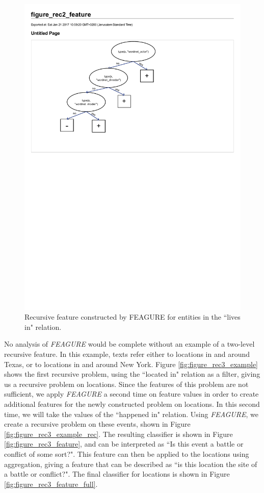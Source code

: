 \documentclass[twoside,11pt]{article}
\theoremstyle{definition}
\begin{document}
\begin{figure}[h!]
	\centering
	\includegraphics[width=0.7\linewidth]{figure_rec2_feature}
	\caption{Recursive feature constructed by FEAGURE for entities in the ``lives in" relation.}
	\label{fig:figure_rec2_feature}
\end{figure}

No analysis of \emph{FEAGURE} would be complete without an example of a two-level recursive feature. In this example, texts refer either to locations in and around Texas, or to locations in and around New York. Figure \ref{fig:figure_rec3_example} shows the first recursive problem, using the ``located in" relation as a filter, giving us a recursive problem on locations. Since the features of this problem are not sufficient, we apply \emph{FEAGURE} a second time on feature values in order to create additional features for the newly constructed problem on locations. In this second time, we will take the values of the ``happened in" relation. Using \emph{FEAGURE}, we create a recursive problem on these events, shown in Figure \ref{fig:figure_rec3_example_rec}. The resulting classifier is shown in Figure \ref{fig:figure_rec3_feature}, and can be interpreted as ``Is this event a battle or conflict of some sort?".
This feature can then be applied to the locations using aggregation, giving a feature that can be described as ``is this location the site of a battle or conflict?". The final classifier for locations is shown in Figure \ref{fig:figure_rec3_feature_full}.
\end{document}
